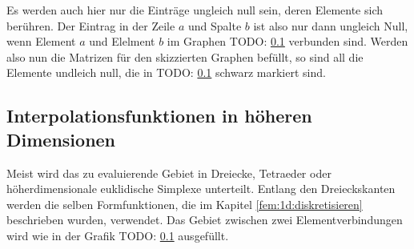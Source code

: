 Es werden auch hier nur die Einträge ungleich null sein, deren Elemente sich berühren.
Der Eintrag in der Zeile $a$ und Spalte $b$ ist also nur dann ungleich Null, wenn Element $a$ und Elelment $b$ im Graphen TODO: \ref{} verbunden sind.
Werden also nun die Matrizen für den skizzierten Graphen befüllt, so sind all die Elemente undleich null, die in TODO: \ref{} schwarz markiert sind.


\subsection{Interpolationsfunktionen in höheren Dimensionen}
Meist wird das zu evaluierende Gebiet in Dreiecke, Tetraeder oder höherdimensionale euklidische Simplexe unterteilt. 
Entlang den Dreieckskanten werden die selben Formfunktionen, die im Kapitel \ref{fem:1d:diskretisieren} beschrieben wurden, verwendet.
Das Gebiet zwischen zwei Elementverbindungen wird wie in der Grafik TODO: \ref{} ausgefüllt.
